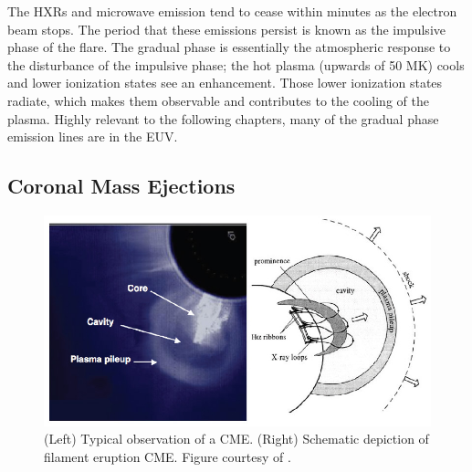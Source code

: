 The HXRs and microwave emission tend to cease within minutes as the electron beam stops. The period that these emissions persist is known as the impulsive phase of the flare. The gradual phase is essentially the atmospheric response to the disturbance of the impulsive phase; the hot plasma (upwards of 50 MK) cools and lower ionization states see an enhancement. Those lower ionization states radiate, which makes them observable and contributes to the cooling of the plasma. Highly relevant to the following chapters, many of the gradual phase emission lines are in the EUV. 

\subsection{Coronal Mass Ejections}
\label{sec:cmes}

\begin{figure}[!h]
    \begin{center}
	    \includegraphics[width=\textwidth]{Images/CMESchematic.png}
    \end{center}
    \caption[Coronal Mass Ejection Schematic]{
        (Left) Typical observation of a CME. (Right) Schematic depiction of filament eruption CME. 
        Figure courtesy of \citet{Forbes2000}.
    }
    \label{fig:cmeschematic}
\end{figure}

